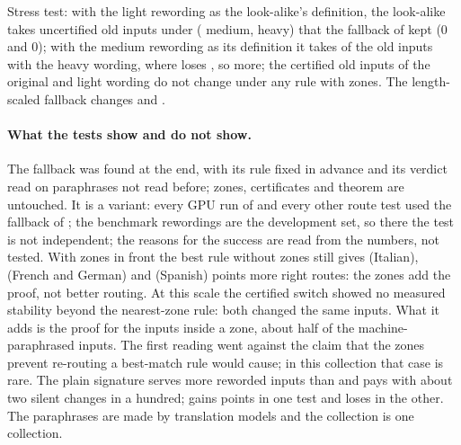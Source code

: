 Stress test: with the light rewording as the look-alike's definition, the look-alike takes \RerouteStressTaken{} uncertified old inputs under \certscaled{} (\RerouteStressCertFourMedium{} medium, \RerouteStressCertFourHeavy{} heavy) that the fallback of \cert{} kept (0 and 0); with the medium rewording as its definition it takes \RerouteStressMedCertFourHeavy{} of the \RerouteStressOld{} old inputs with the heavy wording, where \cert{} loses \RerouteStressMedCertHeavy{}, so \RerouteStressMedExtra{} more; the \RerouteStressOld{} certified old inputs of the original and light wording do not change under any rule with zones. The length-scaled fallback changes \RerouteStressNormMedium{} and \RerouteStressNormHeavy{}.

\paragraph{What the tests show and do not show.} The fallback \scaled{} was found at the end, with its rule fixed in advance and its verdict read on paraphrases not read before; zones, certificates and theorem are untouched. It is a variant: every GPU run of \cert{} and every other route test used the fallback of \cert{}; the benchmark rewordings are the development set, so there the test is not independent; the reasons for the success are read from the numbers, not tested. With zones in front the best rule without zones still gives \RerouteZonesCost{} (Italian), \RerouteZonesCostFG{} (French and German) and \RerouteZonesCostEs{} (Spanish) points more right routes: the zones add the proof, not better routing. At this scale the certified switch showed no measured stability beyond the nearest-zone rule: both changed the same inputs. What it adds is the proof for the inputs inside a zone, about half of the machine-paraphrased inputs. The first reading went against the claim that the zones prevent re-routing a best-match rule would cause; in this collection that case is rare. The plain signature serves more reworded inputs than \cert{} and pays with about two silent changes in a hundred; \hybrid{} gains \RerouteHybGain{} points in one test and loses \RerouteHybLoss{} in the other. The paraphrases are made by translation models and the collection is one collection.
